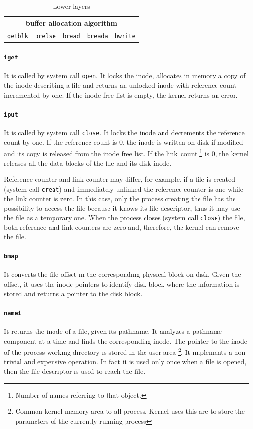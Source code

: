 \documentclass{report}
\begin{document}
\begin{table}
\centering
\begin{tabular}{|c|c|c|c|c|}
\hline 
\multicolumn{5}{|c|}{buffer allocation algorithm} \\ 
\hline 
\texttt{getblk} & \texttt{brelse} & \texttt{bread} & \texttt{breada} & \texttt{bwrite} \\ 
\hline 
\end{tabular} 
\caption{Lower layers}
\label{system_mgmt_lower_layers}
\end{table}

\paragraph{\texttt{iget}} It is called by system call \texttt{open}. It locks the inode, allocates in memory a copy of the inode describing a file and returns an unlocked inode with reference count incremented by one. If the inode free list is empty, the kernel returns an error.

\paragraph{\texttt{iput}} It is called by system call \texttt{close}. It locks the inode and decrements the reference count by one. If the reference count is 0, the inode is written on disk if modified and its copy is released from the inode free list. If the link~count \footnote{Number of names referring to that object.} is 0, the kernel releases all the data blocks of the file and its disk inode.

Reference counter and link counter may differ, for example, if a file is created (system call \texttt{creat}) and immediately unlinked the reference counter is one while the link counter is zero. In this case, only the process creating the file has the possibility to access the file because it knows its file descriptor, thus it may use the file as a temporary one. When the process closes (system call \texttt{close}) the file, both reference and link counters are zero and, therefore, the kernel can remove the file.

\paragraph{\texttt{bmap}} It converts the file offset in the corresponding physical block on disk. Given the offset, it uses the inode pointers to identify disk block where the information is stored and returns a pointer to the disk block.

\paragraph{\texttt{namei}} It returns the inode of a file, given its pathname. It analyzes a pathname component at a time and finds the corresponding inode. The pointer to the inode of the process working directory is stored in the user area \footnote{Common kernel memory area to all process. Kernel uses this are to store the parameters of the currently running process}. It implements a non trivial and expensive operation. In fact it is used only once when a file is opened, then the file descriptor is used to reach the file.
\end{document}
